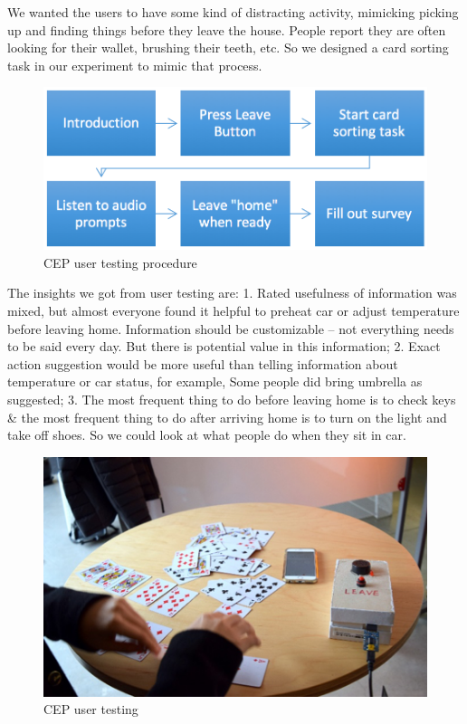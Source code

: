 We wanted the users to have some kind of distracting activity, mimicking picking up and finding things before they leave the house. People report they are often looking for their wallet, brushing their teeth, etc. So we designed a card sorting task in our experiment to mimic that process.

\begin{figure}
\centering
\includegraphics[width=5in]{Figures/Prototypes/CEP/CEPprocedure.png}
	\caption{CEP user testing procedure}
		\label{fig:CEPprocedure}
\end{figure}

The insights we got from user testing are: 1. Rated usefulness of information was mixed, but almost everyone found it helpful to preheat car or adjust temperature before leaving home. Information should be customizable – not everything needs to be said every day. But there is potential value in this information; 2. Exact action suggestion would be more useful than telling information about temperature or car status, for example, Some people did bring umbrella as suggested; 3. The most frequent thing to do before leaving home is to check keys \&{} the most frequent thing to do after arriving home is to turn on the light and take off shoes. So we could look at what people do when they sit in car.

\begin{figure}
\centering
\includegraphics[width=5in]{Figures/Prototypes/CEP/CEPtest1.png}
	\caption{CEP user testing}
		\label{fig:CEPtest1}
\end{figure}

